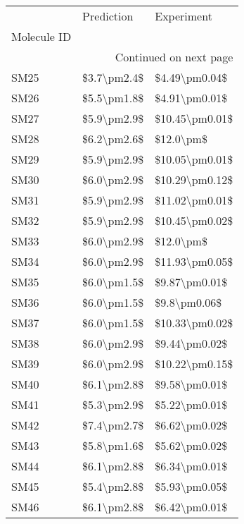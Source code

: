 \begin{longtable}{lll}
\toprule
{} &   Prediction &      Experiment \\
Molecule ID &              &                 \\
\midrule
\endhead
\midrule
\multicolumn{3}{r}{{Continued on next page}} \\
\midrule
\endfoot

\bottomrule
\endlastfoot
SM25        &  \$3.7\textbackslash pm2.4\$ &   \$4.49\textbackslash pm0.04\$ \\
SM26        &  \$5.5\textbackslash pm1.8\$ &   \$4.91\textbackslash pm0.01\$ \\
SM27        &  \$5.9\textbackslash pm2.9\$ &  \$10.45\textbackslash pm0.01\$ \\
SM28        &  \$6.2\textbackslash pm2.6\$ &       \$12.0\textbackslash pm\$ \\
SM29        &  \$5.9\textbackslash pm2.9\$ &  \$10.05\textbackslash pm0.01\$ \\
SM30        &  \$6.0\textbackslash pm2.9\$ &  \$10.29\textbackslash pm0.12\$ \\
SM31        &  \$5.9\textbackslash pm2.9\$ &  \$11.02\textbackslash pm0.01\$ \\
SM32        &  \$5.9\textbackslash pm2.9\$ &  \$10.45\textbackslash pm0.02\$ \\
SM33        &  \$6.0\textbackslash pm2.9\$ &       \$12.0\textbackslash pm\$ \\
SM34        &  \$6.0\textbackslash pm2.9\$ &  \$11.93\textbackslash pm0.05\$ \\
SM35        &  \$6.0\textbackslash pm1.5\$ &   \$9.87\textbackslash pm0.01\$ \\
SM36        &  \$6.0\textbackslash pm1.5\$ &    \$9.8\textbackslash pm0.06\$ \\
SM37        &  \$6.0\textbackslash pm1.5\$ &  \$10.33\textbackslash pm0.02\$ \\
SM38        &  \$6.0\textbackslash pm2.9\$ &   \$9.44\textbackslash pm0.02\$ \\
SM39        &  \$6.0\textbackslash pm2.9\$ &  \$10.22\textbackslash pm0.15\$ \\
SM40        &  \$6.1\textbackslash pm2.8\$ &   \$9.58\textbackslash pm0.01\$ \\
SM41        &  \$5.3\textbackslash pm2.9\$ &   \$5.22\textbackslash pm0.01\$ \\
SM42        &  \$7.4\textbackslash pm2.7\$ &   \$6.62\textbackslash pm0.02\$ \\
SM43        &  \$5.8\textbackslash pm1.6\$ &   \$5.62\textbackslash pm0.02\$ \\
SM44        &  \$6.1\textbackslash pm2.8\$ &   \$6.34\textbackslash pm0.01\$ \\
SM45        &  \$5.4\textbackslash pm2.8\$ &   \$5.93\textbackslash pm0.05\$ \\
SM46        &  \$6.1\textbackslash pm2.8\$ &   \$6.42\textbackslash pm0.01\$ \\
\end{longtable}
